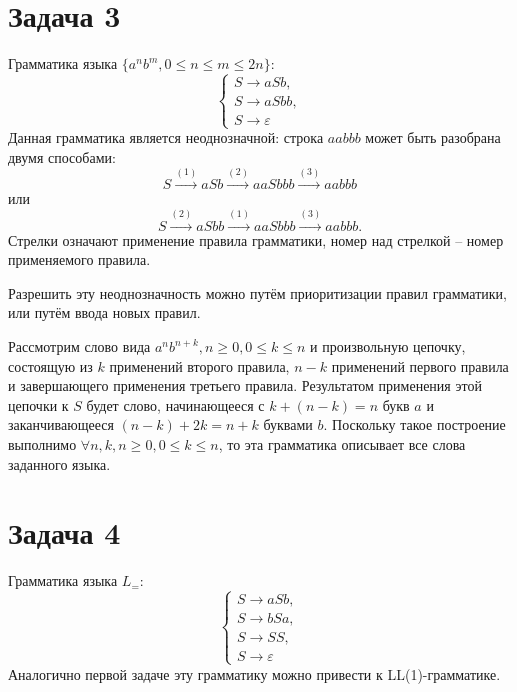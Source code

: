 \documentclass[11pt]{article}
\begin{document}
\section{Задача 3}
\label{sec:orgcb9ab3c}
Грамматика языка \(\{a^nb^m, 0 \leq n \leq m \leq 2n\}\):
\begin{equation}
\begin{cases}
S \rightarrow aSb, \\
S \rightarrow aSbb, \\
S \rightarrow \varepsilon
\end{cases}
\end{equation}
Данная грамматика является неоднозначной: строка $aabbb$ может быть разобрана двумя способами:
\begin{equation}
S \stackrel{(1)}{\rightarrow} aSb \stackrel{(2)}{\rightarrow} aaSbbb \stackrel{(3)}{\rightarrow} aabbb
\end{equation}
или
\begin{equation}
S \stackrel{(2)}{\rightarrow} aSbb \stackrel{(1)}{\rightarrow} aaSbbb \stackrel{(3)}{\rightarrow} aabbb.
\end{equation}
Стрелки означают применение правила грамматики, номер над стрелкой -- номер применяемого правила.

Разрешить эту неоднозначность можно путём приоритизации правил грамматики, или путём ввода
новых правил.

Рассмотрим слово вида $a^nb^{n + k}, n \geq 0, 0 \leq k \leq n$ и произвольную цепочку, состоящую
из $k$ применений второго правила, $n - k$ применений первого правила и завершающего применения
третьего правила. Результатом применения этой цепочки к $S$ будет слово, начинающееся с
$k + (n - k) = n$ букв $a$ и заканчивающееся $(n - k) + 2k = n + k$ буквами $b$. Поскольку
такое построение выполнимо $\forall n, k, n \geq 0, 0 \leq k \leq n$, то эта грамматика описывает
все слова заданного языка.
\section{Задача 4}
\label{sec:orge88b8a9}
Грамматика языка \(L_=\):
\begin{equation}
\begin{cases}
S \rightarrow aSb, \\
S \rightarrow bSa, \\
S \rightarrow SS, \\
S \rightarrow \varepsilon
\end{cases}
\end{equation}
Аналогично первой задаче эту грамматику можно привести к LL(1)-грамматике.
\end{document}
